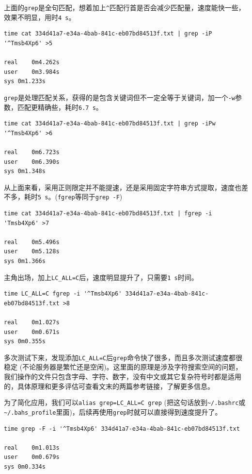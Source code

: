 \documentclass[]{article}
\numberwithin{figure}{section}
\numberwithin{table}{section}
\begin{document}
上面的\texttt{grep}是全句匹配，想着加上\texttt{\^{}}匹配行首是否会减少匹配量，速度能快一些，效果不明显，用时\texttt{4\ s}。

\begin{verbatim}
time cat 334d41a7-e34a-4bab-841c-eb07bd84513f.txt | grep -iP '^Tmsb4Xp6' >5

real	0m4.262s
user	0m3.984s
sys	0m1.233s
\end{verbatim}

\texttt{grep}是处理匹配关系，获得的是包含关键词但不一定全等于关键词，加一个\texttt{-w}参数，匹配更精确些，耗时\texttt{6.7\ s}。

\begin{verbatim}
time cat 334d41a7-e34a-4bab-841c-eb07bd84513f.txt | grep -iPw '^Tmsb4Xp6' >6

real	0m6.723s
user	0m6.390s
sys	0m1.348s
\end{verbatim}

从上面来看，采用正则限定并不能提速，还是采用固定字符串方式提取，速度也差不多，耗时\texttt{5\ s}。(\texttt{fgrep}等同于\texttt{grep\ -F})

\begin{verbatim}
time cat 334d41a7-e34a-4bab-841c-eb07bd84513f.txt | fgrep -i 'Tmsb4Xp6' >7

real	0m5.496s
user	0m5.128s
sys	0m1.366s
\end{verbatim}

主角出场，加上\texttt{LC\_ALL=C}后，速度明显提升了，只需要\texttt{1\ s}时间。

\begin{verbatim}
time LC_ALL=C fgrep -i '^Tmsb4Xp6' 334d41a7-e34a-4bab-841c-eb07bd84513f.txt >8

real	0m1.027s
user	0m0.671s
sys	0m0.355s
\end{verbatim}

多次测试下来，发现添加\texttt{LC\_ALL=C}后\texttt{grep}命令快了很多，而且多次测试速度都很稳定 (不论服务器是繁忙还是空闲)。这里面的原理是涉及字符搜索空间的问题，我们操作的文件只包含字母、字符、数字，没有中文或其它复杂符号时都是适用的，具体原理和更多评估可查看文末的两篇参考链接，了解更多信息。

为了简化应用，我们可以\texttt{alias\ grep=\textquotesingle{}LC\_ALL=C\ grep\textquotesingle{}} (把这句话放到\texttt{\textasciitilde{}/.bashrc}或\texttt{\textasciitilde{}/.bahs\_profile}里面)，后续再使用\texttt{grep}时就可以直接得到速度提升了。

\begin{verbatim}
time grep -F -i '^Tmsb4Xp6' 334d41a7-e34a-4bab-841c-eb07bd84513f.txt 

real	0m1.013s
user	0m0.679s
sys	0m0.334s
\end{verbatim}
\end{document}
